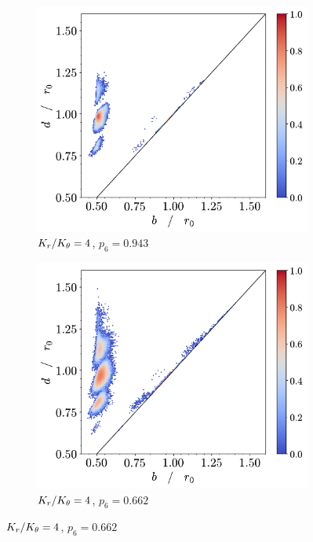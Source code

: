 \begin{figure}[tbp]
	\begin{subfigure}[b]{0.40\textwidth}
         \centering
         \includegraphics[width=\textwidth]{./figures/ph/t_k4_399_bs_pd.pdf}
         \caption{$K_r/K_\theta=4$, $p_6=0.943$}%
         \label{fig:bspde}
     \end{subfigure}
     \hspace{1cm}
        \begin{subfigure}[b]{0.40\textwidth}
         \centering
         \includegraphics[width=\textwidth]{./figures/ph/t_k4_257_bs_pd.pdf}
         \caption{$K_r/K_\theta=4$, $p_6=0.662$}%
         \label{fig:bspdf}
     \end{subfigure}
     

\end{figure}
